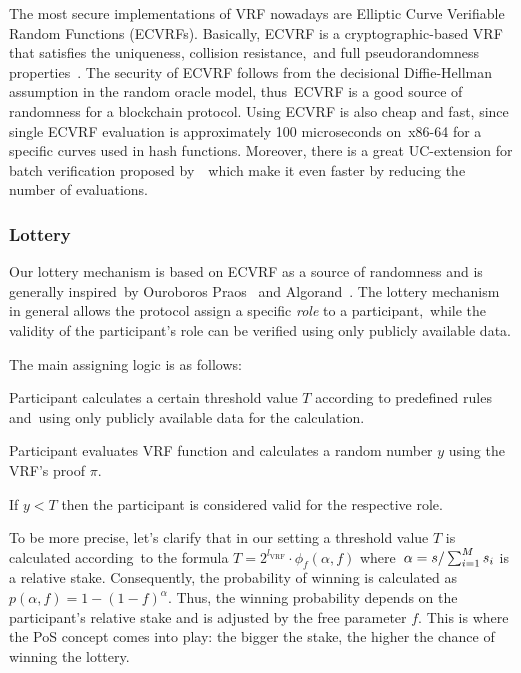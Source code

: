 The most secure implementations of VRF nowadays are Elliptic Curve Verifiable Random Functions (ECVRFs).
Basically, ECVRF is a cryptographic-based VRF that satisfies the uniqueness, collision resistance,\
and full pseudorandomness properties~\cite{cryptoeprint:2014/905}.
The security of ECVRF follows from the decisional Diffie-Hellman assumption in the random oracle model, thus\
ECVRF is a good source of randomness for a blockchain protocol.
Using ECVRF is also cheap and fast, since single ECVRF evaluation is approximately 100 microseconds on\
x86-64 for a specific curves used in hash functions.
Moreover, there is a great UC-extension for batch verification proposed by~\cite{cryptoeprint:2022/1045}\
which make it even faster by reducing the number of evaluations.

\subsubsection{Lottery}
Our lottery mechanism is based on ECVRF as a source of randomness and is generally inspired\
by Ouroboros Praos~\cite{cryptoeprint:2017/573} and Algorand~\cite{cryptoeprint:2017/454}.
The lottery mechanism in general allows the protocol assign a specific \emph{role} to a participant,\
while the validity of the participant's role can be verified using only publicly available data.

The main assigning logic is as follows:
\begin{legal}
    \item Participant calculates a certain threshold value $T$ according to predefined rules and\
    using only publicly available data for the calculation.
    \item Participant evaluates VRF function and calculates a random number $y$ using the VRF's proof $\pi$.
    \item If ${y < T}$ then the participant is considered valid for the respective role.
\end{legal}

To be more precise, let's clarify that in our setting a threshold value $T$ is calculated according\
to the formula ${T = 2^{l_{\text{VRF}}}\cdot \phi_{f}(\alpha, f)}$ where\
${\alpha=s/\\\sum_{i=1}^{M} s_i}$ is a relative stake.
Consequently, the probability of winning is calculated as ${p(\alpha, f) = 1-(1-f)^{\alpha}}$.
Thus, the winning probability depends on the participant's relative stake and is adjusted by the free parameter $f$.
This is where the PoS concept comes into play: the bigger the stake, the higher the chance of winning the lottery.

